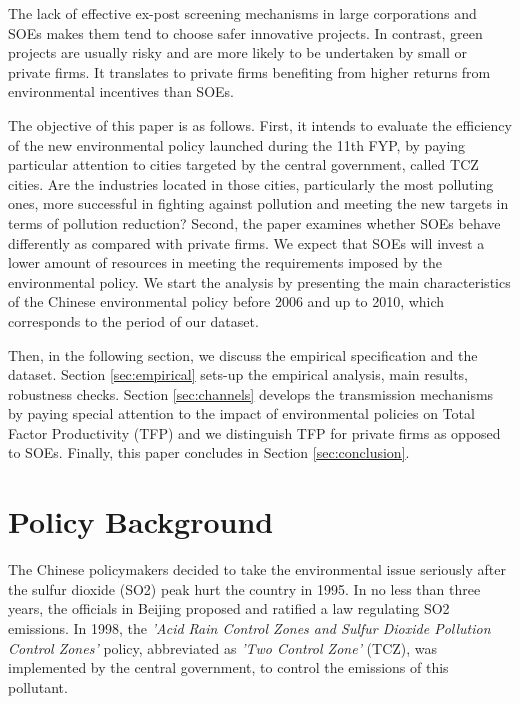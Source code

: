 \documentclass[12pt]{article}
\begin{document}
The lack of effective ex-post screening mechanisms in large corporations and SOEs makes them tend to choose safer innovative projects. In contrast, green projects are usually risky and are more likely to be undertaken by small or private firms. It translates to private firms benefiting from higher returns from environmental incentives than SOEs.  

The objective of this paper is as follows. First, it intends to evaluate the efficiency of the new environmental policy launched during the 11th FYP, by paying particular attention to cities targeted by the central government, called TCZ cities. Are the industries located in those cities, particularly the most polluting ones, more successful in fighting against pollution and meeting the new targets in terms of pollution reduction? Second, the paper examines whether SOEs behave differently as compared with private firms. We expect that SOEs will invest a lower amount of resources in meeting the requirements imposed by the environmental policy. We start the analysis by presenting the main characteristics of the Chinese environmental policy before 2006 and up to 2010, which corresponds to the period of our dataset. 

Then, in the following section, we discuss the empirical specification and the dataset. Section \ref{sec:empirical} sets-up the empirical analysis, main results, robustness checks. Section \ref{sec:channels} develops the transmission mechanisms by paying special attention to the impact of environmental policies on Total Factor Productivity (TFP) and we distinguish TFP for private firms as opposed to SOEs. Finally, this paper concludes in Section \ref{sec:conclusion}.

\section{Policy Background} \label{sec:Policy}

The Chinese policymakers decided to take the environmental issue seriously after the sulfur dioxide (SO2) peak hurt the country in 1995. In no less than three years, the officials in Beijing proposed and ratified a law regulating SO2 emissions. In 1998, the \textit{'Acid Rain Control Zones and Sulfur Dioxide Pollution Control Zones'} policy, abbreviated as \textit{'Two Control Zone'} (TCZ), was implemented by the central government, to control the emissions of this pollutant. 
\end{document}
